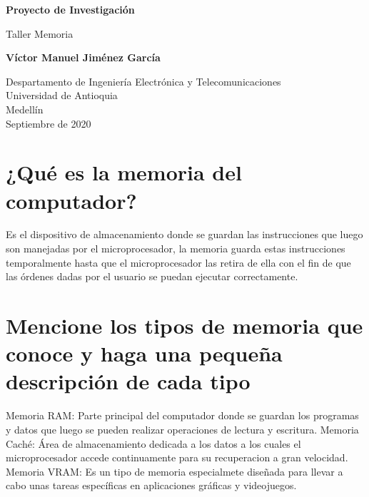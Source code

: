 \documentclass{article}
\begin{document}
\begin{titlepage}
    \begin{center}
        \vspace*{1cm}
            
        \Huge
        \textbf{Proyecto de Investigación}
            
        \vspace{0.5cm}
        \LARGE
        Taller Memoria
            
        \vspace{1.5cm}
            
        \textbf{Víctor Manuel Jiménez García}
            
        \vfill
            
        \vspace{0.8cm}
            
        \Large
        Despartamento de Ingeniería Electrónica y Telecomunicaciones\\
        Universidad de Antioquia\\
        Medellín\\
        Septiembre de 2020
            
    \end{center}
\end{titlepage}

\tableofcontents

\section{¿Qué es la memoria del computador?}
Es el dispositivo de almacenamiento donde se guardan las instrucciones que luego son manejadas por el microprocesador, la memoria guarda estas instrucciones temporalmente hasta que el microprocesador las retira de ella con el fin de que las órdenes dadas por el usuario se puedan ejecutar correctamente.
\cite{memoria}
\section{Mencione los tipos de memoria que conoce y haga una pequeña descripción de cada tipo} \label{contenido}
Memoria RAM: Parte principal del computador donde se guardan los programas y datos que luego se pueden realizar operaciones de lectura y escritura.
Memoria Caché: Área de almacenamiento dedicada a los datos a los cuales el microprocesador accede continuamente para su recuperacion a gran velocidad.
Memoria VRAM: Es un tipo de memoria especialmete diseñada para llevar a cabo unas tareas específicas en aplicaciones gráficas y videojuegos.
\cite{vram}
\end{document}
